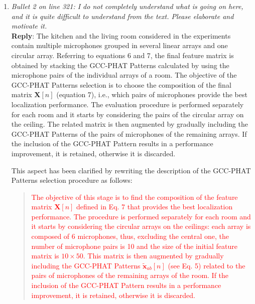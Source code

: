 \documentclass[11pt, technote, letterpaper, oneside, onecolumn]{IEEEtran}
\begin{document}
\begin{enumerate}
\item \textit{Bullet 2 on line 321: I do not completely understand what is going on here, and it is quite difficult to understand from the text. Please elaborate and motivate it.\\}
\textbf{Reply}: The kitchen and the living room considered in the experiments contain multiple microphones grouped in several linear arrays and one circular array. Referring to equations 6 and 7, the final feature matrix is obtained by stacking the GCC-PHAT Patterns calculated by using the microphone pairs of the individual arrays of a room. The objective of the GCC-PHAT Patterns selection is to choose the composition of the final matrix $\mathbf{X}[n]$ (equation 7), i.e., which pairs of microphones provide the best localization performance. The evaluation procedure is performed separately for each room and it starts by considering the pairs of the circular array on the ceiling. The related matrix is then augmented by gradually including the GCC-PHAT Patterns of the pairs of microphones of the remaining arrays. If the inclusion of the GCC-PHAT Pattern results in a performance improvement, it is retained, otherwise it is discarded. %

This aspect has been clarified by rewriting the description of the GCC-PHAT Patterns selection procedure as follows:
\begin{quote}
 \textcolor{red}{The objective of this stage is to find the composition of the feature matrix $\mathbf{X}[n]$ defined in Eq. 7 that provides the best localization performance. The procedure is performed separately for each room and it starts by considering the circular arrays on the ceilings: each array is composed of 6 microphones, thus, excluding the central one, the number of microphone pairs is 10 and the size of the initial feature matrix is $10 \times 50$. This matrix is then augmented by gradually including the GCC-PHAT Patterns $\mathbf{\tilde{x}}_{ab}[n]$ (see Eq. 5) related to the pairs of microphones of the remaining arrays of the room. If the inclusion of the GCC-PHAT Pattern results in a performance improvement, it is retained, otherwise it is discarded.}
\end{quote}


\end{enumerate}
\end{document}

